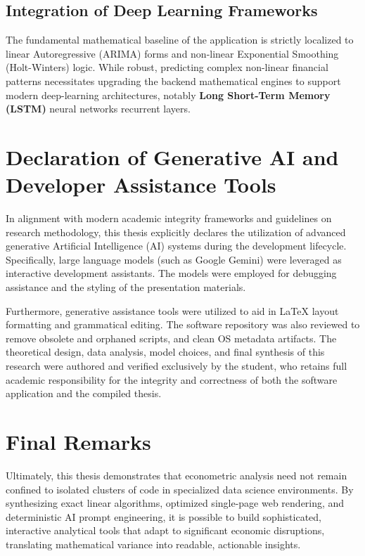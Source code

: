 \subsection{Integration of Deep Learning Frameworks}
The fundamental mathematical baseline of the application is strictly localized to linear Autoregressive (ARIMA) forms and non-linear Exponential Smoothing (Holt-Winters) logic. While robust, predicting complex non-linear financial patterns necessitates upgrading the backend mathematical engines to support modern deep-learning architectures, notably \textbf{Long Short-Term Memory (LSTM)} neural networks recurrent layers. 

\section{Declaration of Generative AI and Developer Assistance Tools}
In alignment with modern academic integrity frameworks and guidelines on research methodology, this thesis explicitly declares the utilization of advanced generative Artificial Intelligence (AI) systems during the development lifecycle. Specifically, large language models (such as Google Gemini) were leveraged as interactive development assistants. The models were employed for debugging assistance and the styling of the presentation materials. 

Furthermore, generative assistance tools were utilized to aid in LaTeX layout formatting and grammatical editing. The software repository was also reviewed to remove obsolete and orphaned scripts, and clean OS metadata artifacts. The theoretical design, data analysis, model choices, and final synthesis of this research were authored and verified exclusively by the student, who retains full academic responsibility for the integrity and correctness of both the software application and the compiled thesis.

\section{Final Remarks}
Ultimately, this thesis demonstrates that econometric analysis need not remain confined to isolated clusters of code in specialized data science environments. By synthesizing exact linear algorithms, optimized single-page web rendering, and deterministic AI prompt engineering, it is possible to build sophisticated, interactive analytical tools that adapt to significant economic disruptions, translating mathematical variance into readable, actionable insights.
